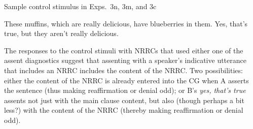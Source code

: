 \documentclass[11pt,fleqn]{article}
\newcommand{\6}{\mbox{$[\hspace*{-.6mm}[$}}
\newcommand{\9}{\mbox{$]\hspace*{-.6mm}]$}}
\begin{document}
\begin{exe}
 Sample control stimulus in Exps.~3n, 3m, and 3c
\begin{xlist}
 These muffins, which are really delicious, have blueberries in them.
 Yes, that's true, but they aren't really delicious.
\end{xlist}
\end{exe}

The responses to the control stimuli with NRRCs that used either one of the assent diagnostics suggest that assenting with a speaker's indicative utterance that includes an NRRC includes the content of the NRRC. Two possibilities: either the content of the NRRC is already entered into the CG when A asserts the sentence (thus making reaffirmation or denial odd); or B's {\em yes, that's true} assents not just with the main clause content, but also (though perhaps a bit less?) with the content of the NRRC (thereby making reaffirmation or denial odd).




\end{document}
